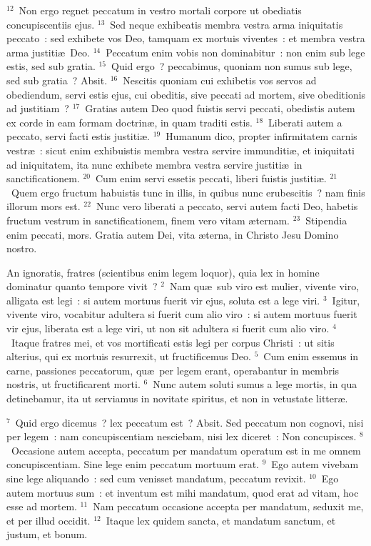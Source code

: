 ${}^{12}$~Non ergo regnet peccatum in vestro mortali corpore ut obediatis concupiscentiis ejus.
${}^{13}$~Sed neque exhibeatis membra vestra arma iniquitatis peccato~: sed exhibete vos Deo, tamquam ex mortuis viventes~: et membra vestra arma justiti\ae\ Deo.
${}^{14}$~Peccatum enim vobis non dominabitur~: non enim sub lege estis, sed sub gratia.
${}^{15}$~Quid ergo~? peccabimus, quoniam non sumus sub lege, sed sub gratia~? Absit.
${}^{16}$~Nescitis quoniam cui exhibetis vos servos ad obediendum, servi estis ejus, cui obeditis, sive peccati ad mortem, sive obeditionis ad justitiam~?
${}^{17}$~Gratias autem Deo quod fuistis servi peccati, obedistis autem ex corde in eam formam doctrin\ae , in quam traditi estis.
${}^{18}$~Liberati autem a peccato, servi facti estis justiti\ae .
${}^{19}$~Humanum dico, propter infirmitatem carnis vestr\ae~: sicut enim exhibuistis membra vestra servire immunditi\ae , et iniquitati ad iniquitatem, ita nunc exhibete membra vestra servire justiti\ae\ in sanctificationem.
${}^{20}$~Cum enim servi essetis peccati, liberi fuistis justiti\ae .
${}^{21}$~Quem ergo fructum habuistis tunc in illis, in quibus nunc erubescitis~? nam finis illorum mors est.
${}^{22}$~Nunc vero liberati a peccato, servi autem facti Deo, habetis fructum vestrum in sanctificationem, finem vero vitam \ae ternam.
${}^{23}$~Stipendia enim peccati, mors. Gratia autem Dei, vita \ae terna, in Christo Jesu Domino nostro.

\lettrine[lines=3,image=true,loversize=0.05,lraise=-0.03]{A}{}n ignoratis, fratres (scientibus enim legem loquor), quia lex in homine dominatur quanto tempore vivit~?
${}^{2}$~Nam qu\ae\ sub viro est mulier, vivente viro, alligata est legi~: si autem mortuus fuerit vir ejus, soluta est a lege viri.
${}^{3}$~Igitur, vivente viro, vocabitur adultera si fuerit cum alio viro~: si autem mortuus fuerit vir ejus, liberata est a lege viri, ut non sit adultera si fuerit cum alio viro.
${}^{4}$~Itaque fratres mei, et vos mortificati estis legi per corpus Christi~: ut sitis alterius, qui ex mortuis resurrexit, ut fructificemus Deo.
${}^{5}$~Cum enim essemus in carne, passiones peccatorum, qu\ae\ per legem erant, operabantur in membris nostris, ut fructificarent morti.
${}^{6}$~Nunc autem soluti sumus a lege mortis, in qua detinebamur, ita ut serviamus in novitate spiritus, et non in vetustate litter\ae .


${}^{7}$~Quid ergo dicemus~? lex peccatum est~? Absit. Sed peccatum non cognovi, nisi per legem~: nam concupiscentiam nesciebam, nisi lex diceret~: Non concupisces.
${}^{8}$~Occasione autem accepta, peccatum per mandatum operatum est in me omnem concupiscentiam. Sine lege enim peccatum mortuum erat.
${}^{9}$~Ego autem vivebam sine lege aliquando~: sed cum venisset mandatum, peccatum revixit.
${}^{10}$~Ego autem mortuus sum~: et inventum est mihi mandatum, quod erat ad vitam, hoc esse ad mortem.
${}^{11}$~Nam peccatum occasione accepta per mandatum, seduxit me, et per illud occidit.
${}^{12}$~Itaque lex quidem sancta, et mandatum sanctum, et justum, et bonum.


